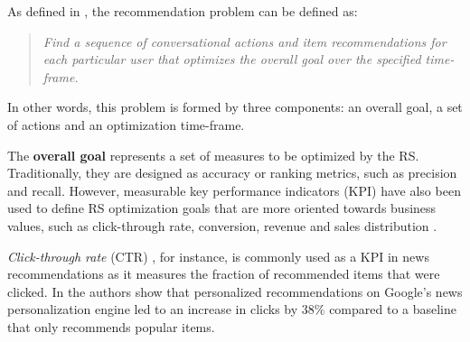     As defined in \cite{2016BeyondMatrixCompletion}, the recommendation problem can be defined as: 

    \begin{quote}
      \textit{Find a sequence of conversational actions and item recommendations for each particular user that 
      optimizes the overall goal over the specified time-frame.}  
    \end{quote}
    
    In other words, this problem is formed by three components: an overall goal, a set of actions and     an optimization time-frame. 

    The \textbf{overall goal} represents a set of measures to be optimized by the RS. Traditionally, they are designed as accuracy or ranking metrics, such as precision and recall. However, measurable key performance indicators (KPI)  have also been used to define RS optimization goals that are more oriented towards business values, such as click-through rate, conversion, revenue and sales distribution  \cite{2019BusinessValue}.


    
    \textit{Click-through rate} (CTR) , for instance, is commonly used as a KPI in news recommendations as it measures the fraction of recommended items that were clicked. In \cite{2007GoogleNews} the authors show that personalized recommendations on Google's news personalization engine led to an increase in clicks by $38\%$ compared to a baseline that only recommends popular items. 


